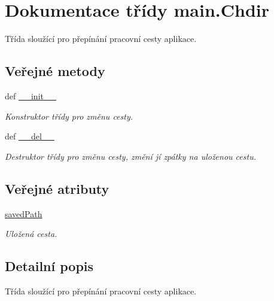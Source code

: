\hypertarget{classmain_1_1Chdir}{\section{Dokumentace třídy main.\-Chdir}
\label{d2/dbd/classmain_1_1Chdir}
}


Třída sloužící pro přepínání pracovní cesty aplikace.  


\subsection*{Veřejné metody}
\begin{DoxyCompactItemize}
\item 
def \hyperlink{classmain_1_1Chdir_ac7361f2ea260c83ed6b42a7047c80214}{\-\_\-\-\_\-init\-\_\-\-\_\-}
\begin{DoxyCompactList}\small\item\em Konstruktor třídy pro změnu cesty. \end{DoxyCompactList}\item 
def \hyperlink{classmain_1_1Chdir_add811e304912724c03da489a37cfe2d5}{\-\_\-\-\_\-del\-\_\-\-\_\-}
\begin{DoxyCompactList}\small\item\em Destruktor třídy pro změnu cesty, změní jí zpátky na uloženou cestu. \end{DoxyCompactList}\end{DoxyCompactItemize}
\subsection*{Veřejné atributy}
\begin{DoxyCompactItemize}
\item 
\hypertarget{classmain_1_1Chdir_a8fcc4e44e462eb780f7694ba60f226d9}{\hyperlink{classmain_1_1Chdir_a8fcc4e44e462eb780f7694ba60f226d9}{saved\-Path}}\label{d2/dbd/classmain_1_1Chdir_a8fcc4e44e462eb780f7694ba60f226d9}

\begin{DoxyCompactList}\small\item\em Uložená cesta. \end{DoxyCompactList}\end{DoxyCompactItemize}


\subsection{Detailní popis}
Třída sloužící pro přepínání pracovní cesty aplikace. 

